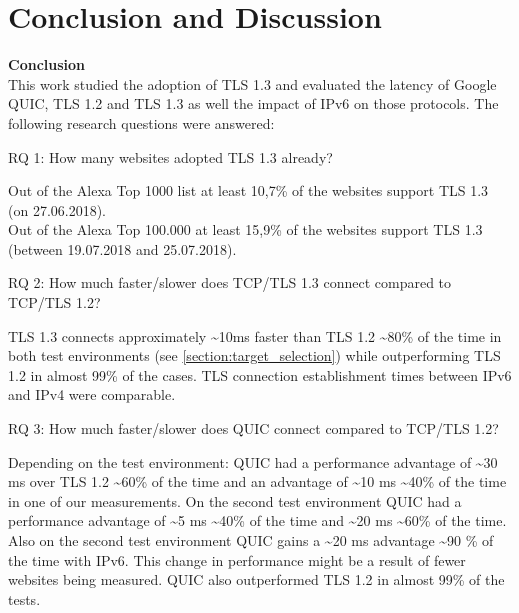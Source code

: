 \chapter{Conclusion and Discussion}\label{chapter:conlusion}

\noindent\textbf{Conclusion}\\
This work studied the adoption of TLS 1.3 and evaluated the latency of Google QUIC, TLS 1.2 and TLS 1.3 as well the impact of IPv6 on those protocols. The following research questions were answered:


\begin{QandA}
   
   \item [RQ 1:] How many websites adopted TLS 1.3 already?
        \begin{answered}
        Out of the Alexa Top 1000 list at least 10,7\% of the websites support TLS 1.3 (on 27.06.2018).\\
        Out of the Alexa Top 100.000 at least 15,9\% of the websites support TLS 1.3 (between 19.07.2018 and 25.07.2018).
   		\end{answered}
   \item [RQ 2:] How much faster/slower does TCP/TLS 1.3 connect compared to TCP/TLS 1.2?
   		\begin{answered}
   		TLS 1.3 connects approximately \textasciitilde 10ms faster than TLS 1.2 \textasciitilde 80\% of the time in both test environments (see \ref{section:target_selection}) while outperforming TLS 1.2 in almost 99\% of the cases.
   		TLS connection establishment times between IPv6 and IPv4 were comparable.
   		\end{answered}
   \item [RQ 3:] How much faster/slower does QUIC connect compared to TCP/TLS 1.2?
		\begin{answered}
		Depending on the test environment:
		QUIC had a performance advantage of \textasciitilde 30 ms over TLS 1.2 \textasciitilde 60\% of the time and an advantage of \textasciitilde 10 ms \textasciitilde 40\% of the time in one of our measurements.
		On the second test environment QUIC had a performance advantage of \textasciitilde 5 ms \textasciitilde 40\% of the time and \textasciitilde 20 ms \textasciitilde 60\% of the time.
		Also on the second test environment QUIC gains a \textasciitilde 20 ms advantage \textasciitilde 90 \% of the time with IPv6.
		This change in performance might be a result of fewer websites being measured.				
		QUIC also outperformed TLS 1.2 in almost 99\% of the tests.		

\end{answered}
\end{QandA}

